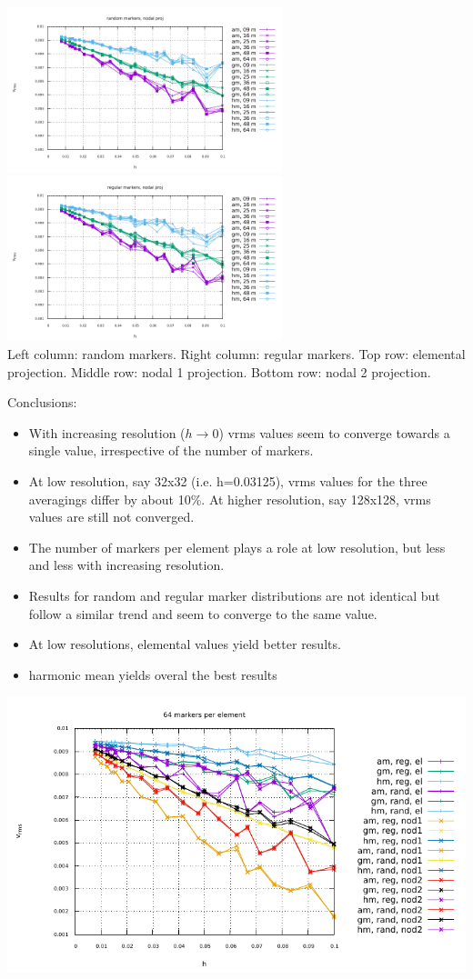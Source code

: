 \begin{center}
\includegraphics[width=8cm]{python_codes/fieldstone_markers_avrg/vrms_rand_proj3} 
\includegraphics[width=8cm]{python_codes/fieldstone_markers_avrg/vrms_norand_proj3}\\
Left column: random markers. Right column: regular markers.
Top row: elemental projection. Middle row: nodal 1 projection. Bottom row: nodal 2 projection. 
\end{center}

Conclusions:
\begin{itemize}
\item
With increasing resolution ($h\rightarrow 0$) vrms values seem to converge towards a single value, irrespective 
of the number of markers. 

\item
At low resolution, say 32x32 (i.e. h=0.03125), vrms values for the three averagings differ by about 10\%. At higher resolution, say 128x128, vrms values are still not converged.  

\item
The number of markers per element plays a role at low resolution, but less and less with increasing resolution. 

\item
Results for random and regular marker distributions are not identical but follow a similar trend and seem to converge to 
the same value.

\item
At low resolutions, elemental values yield better results.

\item harmonic mean yields overal the best results
\end{itemize}

\includegraphics[width=15cm]{python_codes/fieldstone_markers_avrg/vrms} 
